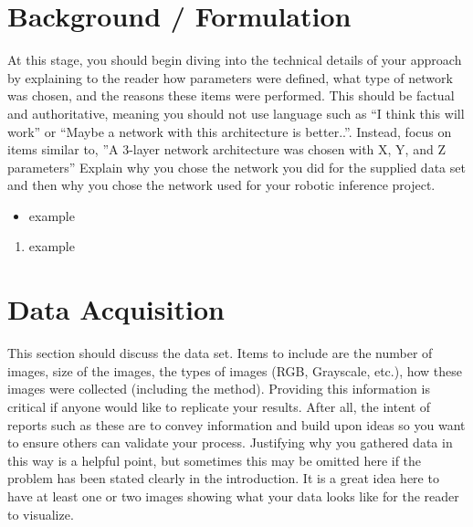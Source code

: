 \documentclass[10pt,journal,compsoc]{IEEEtran}
\begin{document}
		
		
		
		
		\section{Background / Formulation}
		At this stage, you should begin diving into the technical details of your approach by explaining to the reader how parameters were defined, what type of network was chosen, and the reasons these items were performed. This should be factual and authoritative, meaning you should not use language such as “I think this will work” or “Maybe a network with this architecture is better..”. Instead, focus on items similar to, ”A 3-layer network architecture was chosen with X, Y, and Z parameters” 
		Explain why you chose the network you did for the supplied data set and then why you chose the network used for your robotic inference project.
		
		
		\begin{itemize}
			\item example
			\end {itemize}
			
			
			
			\begin{enumerate}
				\item example
				
			\end{enumerate}
			
			\section{Data Acquisition}
			This section should discuss the data set. Items to include are the number of images, size of the images, the types of images (RGB, Grayscale, etc.), how these images were collected (including the method). Providing this information is critical if anyone would like to replicate your results. After all, the intent of reports such as these are to convey information and build upon ideas so you want to ensure others can validate your process.
			Justifying why you gathered data in this way is a helpful point, but sometimes this may be omitted here if the problem has been stated clearly in the introduction.
			It is a great idea here to have at least one or two images showing what your data looks like for the reader to visualize.
			
\end{document}
